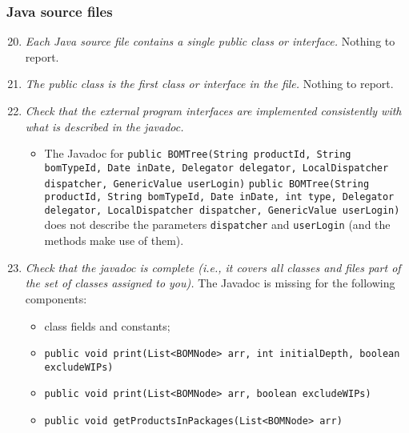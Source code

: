 	\subsubsection{Java source files}
		\begin{enumerate}
			\setcounter{enumi}{19}
			\item \textit{Each Java source file contains a single public class or interface.}\newline
			Nothing to report. %

			\item \textit{The public class is the first class or interface in the file.}\newline
			Nothing to report. %

			\item \textit{Check that the external program interfaces are implemented consistently with what is described in the javadoc.}
			\begin{itemize}
				\item The Javadoc for\newline
				\texttt{public BOMTree(String productId, String bomTypeId, Date inDate, Delegator delegator, LocalDispatcher dispatcher, GenericValue userLogin)}\newline
				\texttt{public BOMTree(String productId, String bomTypeId, Date inDate, int type, Delegator delegator, LocalDispatcher dispatcher, GenericValue userLogin)}\newline
				does not describe the parameters \texttt{dispatcher} and \texttt{userLogin} (and the methods make use of them).
			\end{itemize}

			\item \textit{Check that the javadoc is complete (i.e., it covers all classes and files part of the set of classes assigned to you).}\newline
			The Javadoc is missing for the following components:
			\begin{itemize}
				\item class fields and constants;
				\item \texttt{public void print(List<BOMNode> arr, int initialDepth, boolean excludeWIPs)}
				\item \texttt{public void print(List<BOMNode> arr, boolean excludeWIPs)}
				\item \texttt{public void getProductsInPackages(List<BOMNode> arr)}
			\end{itemize}
		\end{enumerate}

